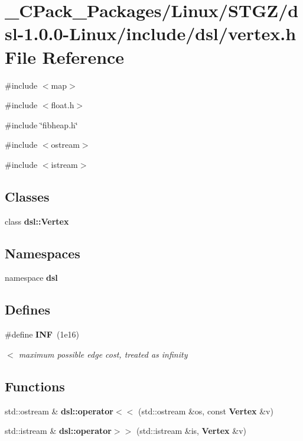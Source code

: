 \section{\_\-CPack\_\-Packages/Linux/STGZ/dsl-\/1.0.0-\/Linux/include/dsl/vertex.h File Reference}
\label{__CPack__Packages_2Linux_2STGZ_2dsl-1_80_80-Linux_2include_2dsl_2vertex_8h}
{\ttfamily \#include $<$map$>$}\par
{\ttfamily \#include $<$float.h$>$}\par
{\ttfamily \#include \char`\"{}fibheap.h\char`\"{}}\par
{\ttfamily \#include $<$ostream$>$}\par
{\ttfamily \#include $<$istream$>$}\par
\subsection*{Classes}
\begin{DoxyCompactItemize}
\item 
class {\bf dsl::Vertex}
\end{DoxyCompactItemize}
\subsection*{Namespaces}
\begin{DoxyCompactItemize}
\item 
namespace {\bf dsl}
\end{DoxyCompactItemize}
\subsection*{Defines}
\begin{DoxyCompactItemize}
\item 
\#define {\bf INF}~(1e16)
\begin{DoxyCompactList}\small\item\em $<$ maximum possible edge cost, treated as infinity \item\end{DoxyCompactList}\end{DoxyCompactItemize}
\subsection*{Functions}
\begin{DoxyCompactItemize}
\item 
std::ostream \& {\bf dsl::operator$<$$<$} (std::ostream \&os, const {\bf Vertex} \&v)
\item 
std::istream \& {\bf dsl::operator$>$$>$} (std::istream \&is, {\bf Vertex} \&v)
\end{DoxyCompactItemize}



